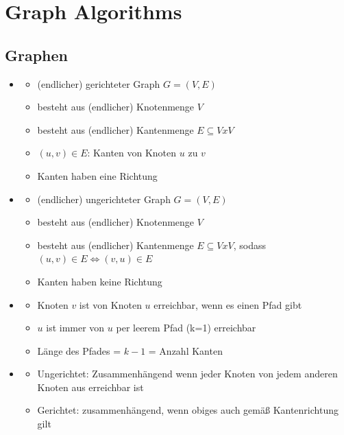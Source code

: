 \documentclass[
    12pt,
    a4paper,
    ngerman,
    color=3b,%
    marginpar=false,
    colorback=false,
    leqno,
]{tudaexercise}
\begin{document}
\section{Graph Algorithms}
\subsection{Graphen}
    \begin{itemize}
        \item {}
            \begin{itemize}
                \item (endlicher) gerichteter Graph $G = (V,E)$
                \item besteht aus (endlicher) Knotenmenge $V$
                \item besteht aus (endlicher) Kantenmenge $E \subseteq V x V$
                \item $(u,v) \in E$: Kanten von Knoten $u$ zu $v$
                \item Kanten haben eine Richtung
            \end{itemize}

        \item {}
            \begin{itemize}
                \item (endlicher) ungerichteter Graph $G = (V,E)$
                \item besteht aus (endlicher) Knotenmenge $V$
                \item besteht aus (endlicher) Kantenmenge $E \subseteq V x V$, sodass $(u,v) \in E \Leftrightarrow (v,u) \in E$
                \item Kanten haben keine Richtung
            \end{itemize}

        \item {}
            \begin{itemize}
                \item Knoten $v$ ist von Knoten $u$ erreichbar, wenn es einen Pfad gibt
                \item $u$ ist immer von $u$ per leerem Pfad (k=1) erreichbar
                \item Länge des Pfades = $k - 1$ = Anzahl Kanten
            \end{itemize}

        \item {}
            \begin{itemize}
                \item Ungerichtet: Zusammenhängend wenn jeder Knoten von jedem anderen Knoten aus erreichbar ist
                \item Gerichtet:  zusammenhängend, wenn obiges auch gemäß Kantenrichtung gilt
            \end{itemize}


\end{itemize}
\end{document}
